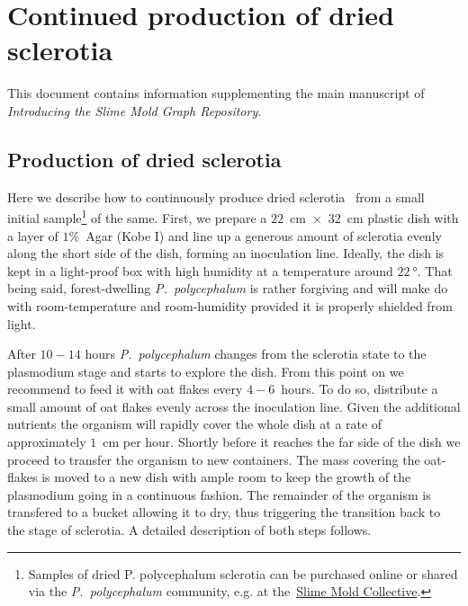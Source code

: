 
\chapter{Continued production of dried sclerotia}

This document contains information supplementing the main manuscript of \emph{Introducing the Slime Mold Graph Repository}.

\section{Production of dried sclerotia}

  Here we describe how to continuously produce dried sclerotia~\cite{lifecycle} from a small initial sample\footnote{Samples of dried P. polycephalum sclerotia can be purchased online or shared via the \emph{P.~polycephalum} community, e.g. at the~\href{http://slimoco.ning.com/}{Slime Mold Collective}.} of the same. First, we prepare a $22$~cm~$\times$~$32$~cm plastic dish with a layer of $1 \%$~Agar (Kobe I) and line up a generous amount of sclerotia evenly along the short side of the dish, forming an inoculation line. Ideally, the dish is kept in a light-proof box with high humidity at a temperature around $\SI{22}{\degree}$. That being said, forest-dwelling \emph{P.~polycephalum} is rather forgiving and will make do with room-temperature and room-humidity provided it is properly shielded from light.

  After $10-14$ hours \emph{P.~polycephalum} changes from the sclerotia state to the plasmodium stage and starts to explore the dish. From this point on we recommend to feed it with oat flakes every $4-6$~hours. To do so, distribute a small amount of oat flakes evenly across the inoculation line. Given the additional nutrients the organism will rapidly cover the whole dish at a rate of approximately $1$~cm per hour. Shortly before it reaches the far side of the dish we proceed to transfer the organism to new containers. The mass covering the oat-flakes is moved to a new dish with ample room to keep the growth of the plasmodium going in a continuous fashion. The remainder of the organism is transfered to a bucket allowing it to dry, thus triggering the transition back to the stage of sclerotia. A detailed description of both steps follows.

